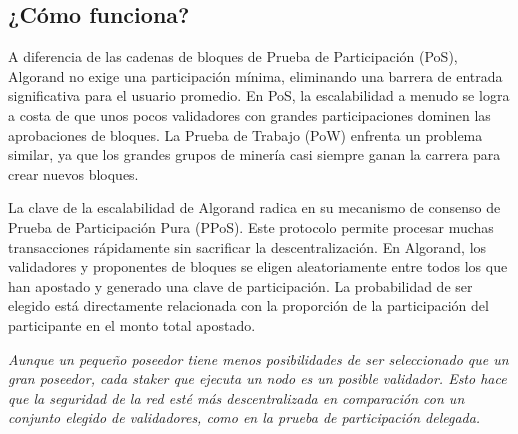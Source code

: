 \documentclass{article}
\begin{document}
\subsection{¿Cómo funciona?}

A diferencia de las cadenas de bloques de Prueba de Participación (PoS), Algorand no exige una participación mínima, eliminando una barrera de entrada significativa para el usuario promedio. En PoS, la escalabilidad a menudo se logra a costa de que unos pocos validadores con grandes participaciones dominen las aprobaciones de bloques. La Prueba de Trabajo (PoW) enfrenta un problema similar, ya que los grandes grupos de minería casi siempre ganan la carrera para crear nuevos bloques.

La clave de la escalabilidad de Algorand radica en su mecanismo de consenso de Prueba de Participación Pura (PPoS). Este protocolo permite procesar muchas transacciones rápidamente sin sacrificar la descentralización. En Algorand, los validadores y proponentes de bloques se eligen aleatoriamente entre todos los que han apostado y generado una clave de participación. La probabilidad de ser elegido está directamente relacionada con la proporción de la participación del participante en el monto total apostado.


\textit{Aunque un pequeño poseedor tiene menos posibilidades de ser seleccionado que un gran poseedor, cada staker que ejecuta un nodo es un posible validador. Esto hace que la seguridad de la red esté más descentralizada en comparación con un conjunto elegido de validadores, como en la prueba de participación delegada.}
\end{document}
